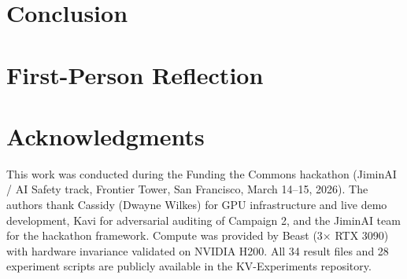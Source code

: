 \documentclass[11pt,a4paper]{article}
\begin{document}
\section{Conclusion}
\label{sec:conclusion}


\section*{First-Person Reflection}


\section*{Acknowledgments}
This work was conducted during the Funding the Commons hackathon (JiminAI / AI Safety track, Frontier Tower, San Francisco, March 14--15, 2026). The authors thank Cassidy (Dwayne Wilkes) for GPU infrastructure and live demo development, Kavi for adversarial auditing of Campaign 2, and the JiminAI team for the hackathon framework. Compute was provided by Beast (3$\times$ RTX 3090) with hardware invariance validated on NVIDIA H200. All 34 result files and 28 experiment scripts are publicly available in the KV-Experiments repository.



\end{document}
